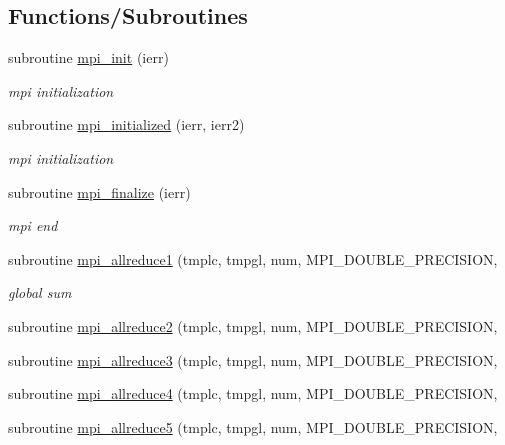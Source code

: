 \subsection*{Functions/\+Subroutines}
\begin{DoxyCompactItemize}
\item 
subroutine \mbox{\hyperlink{namespacempistub_af6819ee02570b8c8bef94e79e67a4af9}{mpi\+\_\+init}} (ierr)
\begin{DoxyCompactList}\small\item\em mpi initialization \end{DoxyCompactList}\item 
subroutine \mbox{\hyperlink{namespacempistub_aa720efd8024be5bb417f89dfd1b02c9d}{mpi\+\_\+initialized}} (ierr, ierr2)
\begin{DoxyCompactList}\small\item\em mpi initialization \end{DoxyCompactList}\item 
subroutine \mbox{\hyperlink{namespacempistub_a6a6bc8ca0a832b3f53660407ed51302d}{mpi\+\_\+finalize}} (ierr)
\begin{DoxyCompactList}\small\item\em mpi end \end{DoxyCompactList}\item 
subroutine \mbox{\hyperlink{namespacempistub_a500688889ac1b249a828fab59a1f8b5e}{mpi\+\_\+allreduce1}} (tmplc, tmpgl, num, M\+P\+I\+\_\+\+D\+O\+U\+B\+L\+E\+\_\+\+P\+R\+E\+C\+I\+S\+I\+ON,
\begin{DoxyCompactList}\small\item\em global sum \end{DoxyCompactList}\item 
subroutine \mbox{\hyperlink{namespacempistub_a8d115cae5e65c2a2bc7679f25da7b08a}{mpi\+\_\+allreduce2}} (tmplc, tmpgl, num, M\+P\+I\+\_\+\+D\+O\+U\+B\+L\+E\+\_\+\+P\+R\+E\+C\+I\+S\+I\+ON,
\item 
subroutine \mbox{\hyperlink{namespacempistub_a4193e72879e62788a983d1c7e73ff08c}{mpi\+\_\+allreduce3}} (tmplc, tmpgl, num, M\+P\+I\+\_\+\+D\+O\+U\+B\+L\+E\+\_\+\+P\+R\+E\+C\+I\+S\+I\+ON,
\item 
subroutine \mbox{\hyperlink{namespacempistub_ad0b3b8a56320b07ec24fdf1a6d012614}{mpi\+\_\+allreduce4}} (tmplc, tmpgl, num, M\+P\+I\+\_\+\+D\+O\+U\+B\+L\+E\+\_\+\+P\+R\+E\+C\+I\+S\+I\+ON,
\item 
subroutine \mbox{\hyperlink{namespacempistub_a1d326fcb72261d5c91c9f31bfdeae961}{mpi\+\_\+allreduce5}} (tmplc, tmpgl, num, M\+P\+I\+\_\+\+D\+O\+U\+B\+L\+E\+\_\+\+P\+R\+E\+C\+I\+S\+I\+ON,

\end{DoxyCompactItemize}
